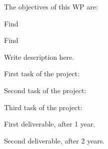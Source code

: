 \begin{workpackage}[id=WPcontrol,wphases=0-48,
  short=Noneq. control, %
  title=Nonequilibrium control, %
  lead=KUL,
  KULRM=12]

\begin{wpobjectives}
  The objectives of this WP are:
  \begin{compactitem}
  \item Find 
  \item Find 
  \end{compactitem}
\end{wpobjectives}

\begin{wpdescription}

Write description here.

\end{wpdescription}

\begin{tasklist}

  \begin{task}[title=TASK1,id=task1,PM=15,lead=KUL,wphases=0-12!0.5]

    First task of the project: 

  \end{task}

  \begin{task}[title=TASK2,id=task2,PM=15,lead=KUL,wphases=9-24!0.5]

    Second task of the project: 

  \end{task}

  \begin{task}[title=TASK3,id=task3,PM=15,lead=KUL,wphases=12-45!1.0]

    Third task of the project: 

    
  \end{task}


\end{tasklist}

\begin{wpdelivs}
  \begin{wpdeliv}[due=12,id=mydeliv1,dissem=PU,nature=DEM,lead=Padova]
      {First deliverable, after 1 year.}
  \end{wpdeliv}
  \begin{wpdeliv}[due=24,id=mydeliv2,dissem=PU,nature=DEM,lead=PAR3]
      {Second deliverable, after 2 years.}
\end{wpdeliv}
\end{wpdelivs}

\end{workpackage}
